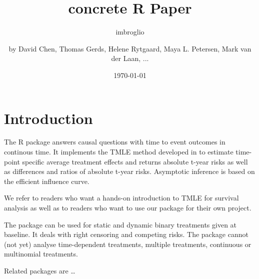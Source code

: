 \documentclass{report}
\author{imbroglio}
\date{\today}
\title{}
\newcommand{\1}{\ensuremath{\mathbf{1}}}
\begin{document}
\title{concrete R Paper}
\author{by David Chen, Thomas Gerds, Helene Rytgaard, Maya L. Petersen, Mark van der Laan, ...}

\maketitle


\section{Introduction}
\label{intro}
The R package  answers causal questions with time to
event outcomes in continous time. It implements the TMLE method
developed in \cite{rytgaard2021one} to estimate time-point specific
average treatment effects and returns absolute t-year risks as well as
differences and ratios of absolute t-year risks. Asymptotic inference
is based on the efficient influence curve.

We refer to readers who want a hands-on introduction to TMLE for
survival analysis as well as to readers who want to use our package
for their own project.

The package can be used for static and dynamic binary treatments given
at baseline. It deals with right censoring and competing risks.  The
package cannot (not yet) analyse time-dependent treatments, multiple
treatments, continuous or multinomial treatments.

Related packages are \ldots{} 
\end{document}
